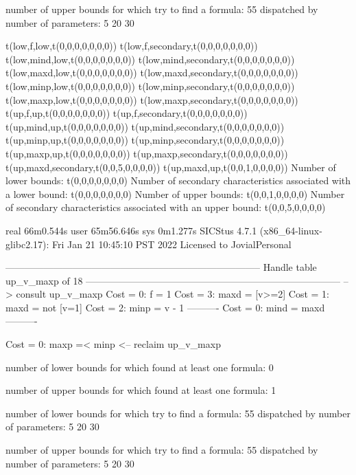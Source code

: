 number of upper bounds for which try to find a formula: 55
dispatched by number of parameters: 5  20  30

t(low,f,low,t(0,0,0,0,0,0,0))
t(low,f,secondary,t(0,0,0,0,0,0,0))
t(low,mind,low,t(0,0,0,0,0,0,0))
t(low,mind,secondary,t(0,0,0,0,0,0,0))
t(low,maxd,low,t(0,0,0,0,0,0,0))
t(low,maxd,secondary,t(0,0,0,0,0,0,0))
t(low,minp,low,t(0,0,0,0,0,0,0))
t(low,minp,secondary,t(0,0,0,0,0,0,0))
t(low,maxp,low,t(0,0,0,0,0,0,0))
t(low,maxp,secondary,t(0,0,0,0,0,0,0))
t(up,f,up,t(0,0,0,0,0,0,0))
t(up,f,secondary,t(0,0,0,0,0,0,0))
t(up,mind,up,t(0,0,0,0,0,0,0))
t(up,mind,secondary,t(0,0,0,0,0,0,0))
t(up,minp,up,t(0,0,0,0,0,0,0))
t(up,minp,secondary,t(0,0,0,0,0,0,0))
t(up,maxp,up,t(0,0,0,0,0,0,0))
t(up,maxp,secondary,t(0,0,0,0,0,0,0))
t(up,maxd,secondary,t(0,0,5,0,0,0,0))
t(up,maxd,up,t(0,0,1,0,0,0,0))
Number of lower bounds:                                             t(0,0,0,0,0,0,0)
Number of secondary characteristics associated with a lower bound:  t(0,0,0,0,0,0,0)
Number of upper bounds:                                             t(0,0,1,0,0,0,0)
Number of secondary characteristics associated with an upper bound: t(0,0,5,0,0,0,0)

real	66m0.544s
user	65m56.646s
sys	0m1.277s
SICStus 4.7.1 (x86_64-linux-glibc2.17): Fri Jan 21 10:45:10 PST 2022
Licensed to JovialPersonal


--------------------------------------------------------------------------------
Handle table up_v_maxp of 18
--------------------------------------------------------------------------------
--> consult up_v_maxp
Cost =  0:  f    = 1
Cost =  3:  maxd = [v>=2]
Cost =  1:  maxd = not [v=1]
Cost =  2:  minp = v - 1
----------
Cost =  0:  mind = maxd
----------

Cost =  0:  maxp =< minp
<-- reclaim up_v_maxp

number of lower bounds for which found at least one formula: 0

number of upper bounds for which found at least one formula: 1

number of lower bounds for which try to find a formula: 55
dispatched by number of parameters: 5  20  30

number of upper bounds for which try to find a formula: 55
dispatched by number of parameters: 5  20  30

